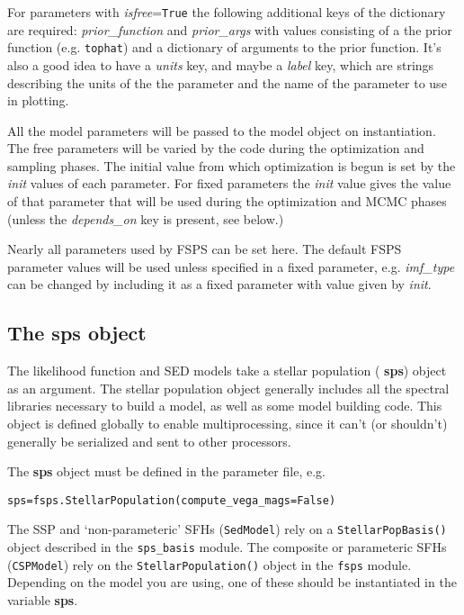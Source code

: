 \documentclass[12pt, letterpaper, preprint]{aastex}
\begin{document}
For parameters with {\it isfree}=\texttt{True} the following
additional keys of the dictionary are required: {\it prior\_function}
and {\it prior\_args} with values consisting of a the prior function
(e.g. \texttt{tophat}) and a dictionary of arguments to the prior
function. It's also a good idea to have a {\it units} key, and maybe a
{\it label} key, which are strings describing the units of the the
parameter and the name of the parameter to use in plotting.

All the model parameters will be passed to the model object on
instantiation.  The free parameters will be varied by the code during
the optimization and sampling phases.  The initial value from which
optimization is begun is set by the {\it init} values of each
parameter.  For fixed parameters the {\it init} value gives the value
of that parameter that will be used during the optimization and MCMC
phases (unless the {\it depends\_on} key is present, see below.)

Nearly all parameters used by FSPS can be set here.  The default FSPS
parameter values will be used unless specified in a fixed parameter,
e.g. {\it imf\_type} can be changed by including it as a fixed
parameter with value given by {\it init}.

\subsection{The {\bf sps} object}
The likelihood function and SED models take a stellar population ({\bf
sps}) object as an argument.  The stellar population object generally
includes all the spectral libraries necessary to build a model, as
well as some model building code. This object is defined globally to
enable multiprocessing, since it can't (or shouldn't) generally be
serialized and sent to other processors.

The {\bf sps} object must be defined in the parameter file, e.g. 

\begin{center}
\texttt{sps=fsps.StellarPopulation(compute\_vega\_mags=False)}
\end{center}

The SSP and `non-parameteric' SFHs (\texttt{SedModel}) rely on a
\texttt{StellarPopBasis()} object described in the \texttt{sps\_basis}
module.  The composite or parameteric SFHs (\texttt{CSPModel}) rely on
the \texttt{StellarPopulation()} object in the \texttt{fsps} module.
Depending on the model you are using, one of these should be
instantiated in the variable {\bf sps}.
\end{document}
